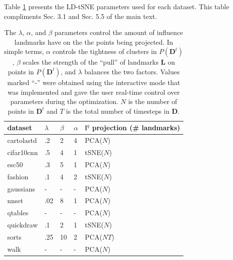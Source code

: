 Table \ref{tab:ld-params} presents the LD-tSNE parameters used for each dataset. This table compliments Sec. 3.1 and Sec. 5.5 of the main text. 

\begin{table}[ht!]
  \centering
  \selectfont
  \scriptsize
  \begin{tabular}{|l|l|l|l|l|}
    \hline
  dataset    & $\lambda$ & $\beta$ & $\alpha$ & $\mathbf{l}^q$ projection (\# landmarks) \\ \hline
  \hline
  cartolastd & .2     & 2  & 4  & PCA($N$)                 \\ \hline
  cifar10cnn & .5     & 4  & 1  & tSNE($N$)               \\ \hline
  esc50      & .3     & 5  & 1  & PCA($N$)                 \\ \hline
  fashion    & .1     & 4  & 2  & tSNE($N$)               \\ \hline
  gaussians  & -      & -  & -  & PCA($N$)                 \\ \hline
  nnset      & .02    & 8  & 1  & PCA($N$)                 \\ \hline
  qtables    & -      & -  & -  & PCA($N$)                 \\ \hline
  quickdraw  & .1     & 2  & 1  & tSNE($N$)               \\ \hline
  sorts      & .25    & 10 & 2  & PCA($NT$)               \\ \hline
  walk       & -      & -  & -  & PCA($N$)                 \\ \hline
  \end{tabular}
  \caption{The $\lambda$, $\alpha$, and $\beta$ parameters control the amount of influence landmarks have on the the points being projected. In simple terms, $\alpha$ controls the tightness of clusters in $P(\mathbf{D}^t)$, $\beta$ scales the strength of the ``pull'' of landmarks $\mathbf{L}$ on points in $P(\mathbf{D}^t)$, and $\lambda$ balances the two factors. 
  Values marked ``-'' were obtained using the interactive mode that was implemented and gave the user real-time control over parameters during the optimization. $N$ is the number of points in $\mathbf{D}^t$ and $T$ is the total number of timesteps in $\mathbf{D}$.}
  \label{tab:ld-params}
\end{table}


